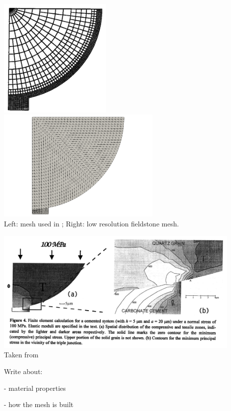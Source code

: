 \begin{center}
\includegraphics[width=5.5cm]{python_codes/fieldstone_63/images/wowu95b}
\includegraphics[width=8cm]{python_codes/fieldstone_63/images/mesh}\\
{\captionfont Left: mesh used in \cite{wowu95}; 
Right: low resolution fieldstone mesh.}
\end{center}


\begin{center}
\includegraphics[width=12cm]{python_codes/fieldstone_63/images/wowu95}\\
{\captionfont Taken from \cite{wowu95}}
\end{center}

Write about:

- material properties

- how the mesh is built

